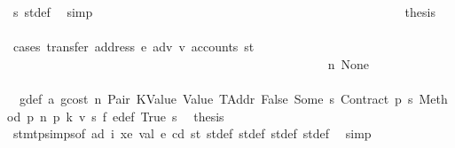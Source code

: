 \begin{isabellebody}
\ s{}\ st{\isacharprime}{\kern0pt}{\isacharprime}{\kern0pt}{\isacharprime}{\kern0pt}{\isacharprime}{\kern0pt}{\isacharunderscore}{\kern0pt}def\ \isamarkupfalse%
\ simp\isanewline
\ \ \ \ \ \ \ \ \ \ \ \ \ \ \ \ \ \ \ \ \ \ \ \ \ \ \ \ \ \ \ \ \ \ \ \ \ \ \ \ \ \ \ \ \ \ \ \ \isamarkupfalse%
\ {\isacharquery}{\kern0pt}thesis\isanewline
\ \ \ \ \ \ \ \ \ \ \ \ \ \ \ \ \ \ \ \ \ \ \ \ \ \ \ \ \ \ \ \ \ \ \ \ \ \ \ \ \ \ \ \ \ \ \ \ \isamarkupfalse%
\ {\isacharparenleft}{\kern0pt}cases\ {\isachardoublequoteopen}transfer\ {\isacharparenleft}{\kern0pt}address\ e{\isacharparenright}{\kern0pt}\ adv\ v{\isacharprime}{\kern0pt}\ {\isacharparenleft}{\kern0pt}accounts\ st{\isacharprime}{\kern0pt}{\isacharprime}{\kern0pt}{\isacharprime}{\kern0pt}{\isacharprime}{\kern0pt}{\isacharparenright}{\kern0pt}{\isachardoublequoteclose}{\isacharparenright}{\kern0pt}\isanewline
\ \ \ \ \ \ \ \ \ \ \ \ \ \ \ \ \ \ \ \ \ \ \ \ \ \ \ \ \ \ \ \ \ \ \ \ \ \ \ \ \ \ \ \ \ \ \ \ \ \ \isamarkupfalse%
\ n{}{\isacharcolon}{\kern0pt}\ None\isanewline
\ \ \ \ \ \ \ \ \ \ \ \ \ \ \ \ \ \ \ \ \ \ \ \ \ \ \ \ \ \ \ \ \ \ \ \ \ \ \ \ \ \ \ \ \ \ \ \ \ \ \isamarkupfalse%
\ {}{\isacharparenleft}{\kern0pt}{}{\isacharparenright}{\kern0pt}\ g{\isacharunderscore}{\kern0pt}def\ a{}\ gcost\ n\ Pair\ KValue\ Value\ TAddr\ False\ Some\ s{}\ Contract\ p{}\ s{}\ Method\ p{}\ n{}\ p{}\ k{}\ v\ s{}\ f{}\ e{\isacharprime}{\kern0pt}{\isacharunderscore}{\kern0pt}def\ True\ s{}\ \isamarkupfalse%
\ {\isacharquery}{\kern0pt}thesis\ \isamarkupfalse%
\ stmt{\isachardot}{\kern0pt}psimps{\isacharparenleft}{\kern0pt}{}{\isacharparenright}{\kern0pt}{\isacharbrackleft}{\kern0pt}of\ ad\ i\ xe\ val\ e\ cd\ st{\isacharbrackright}{\kern0pt}\ st{\isacharprime}{\kern0pt}{\isacharunderscore}{\kern0pt}def\ st{\isacharprime}{\kern0pt}{\isacharprime}{\kern0pt}{\isacharunderscore}{\kern0pt}def\ st{\isacharprime}{\kern0pt}{\isacharprime}{\kern0pt}{\isacharprime}{\kern0pt}{\isacharunderscore}{\kern0pt}def\ st{\isacharprime}{\kern0pt}{\isacharprime}{\kern0pt}{\isacharprime}{\kern0pt}{\isacharprime}{\kern0pt}{\isacharunderscore}{\kern0pt}def\ \isamarkupfalse%
\ simp\isanewline
\ \ \ \ \ \ \ \ \ \ \ \ \ \ \ \ \ \ \ \ \ \ \ \ \ \ \ \ \ \ \ \ \ \ \ \ \ \ \ \ \ \ \ \ \ \ \ \ \isamarkupfalse%
\isanewline

\end{isabellebody}
